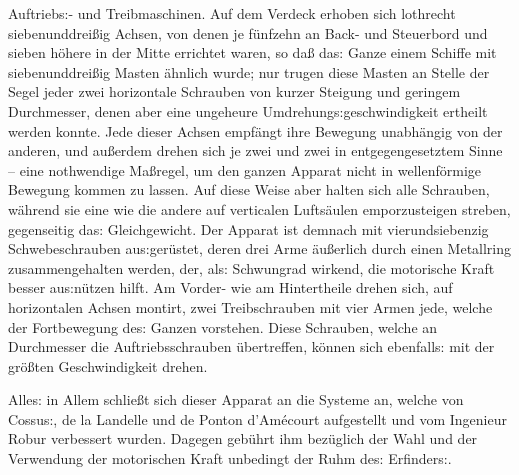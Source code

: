 \documentclass[oneside,12pt]{book}
\newcommand{\s}{s:}
\begin{document}
Auftrieb{\s}- und Treibmaschinen. Auf dem Verdeck erhoben sich
lothrecht siebenunddrei{\ss}ig Achsen, von denen je f\"unfzehn an
Back- und Steuerbord und sieben h\"ohere in der Mitte errichtet
waren, so da{\ss} da{\s} Ganze einem Schiffe mit siebenunddrei{\ss}ig
Masten \"ahnlich wurde; nur trugen diese Masten an Stelle der Segel
jeder zwei horizontale Schrauben von kurzer Steigung und geringem
Durchmesser, denen aber eine ungeheure Umdrehung{\s}geschwindigkeit
ertheilt werden konnte. Jede dieser Achsen empf\"angt ihre Bewegung
unabh\"angig von der anderen, und au{\ss}erdem drehen sich je zwei
und zwei in entgegengesetztem Sinne -- eine nothwendige Ma{\ss}regel,
um den ganzen Apparat nicht in wellenf\"ormige Bewegung kommen zu
lassen. Auf diese Weise aber halten sich alle Schrauben, w\"ahrend
sie eine wie die andere auf verticalen Lufts\"aulen emporzusteigen
streben, gegenseitig da{\s} Gleichgewicht. Der Apparat ist demnach
mit vierundsiebenzig Schwebeschrauben au{\s}ger\"ustet, deren drei
Arme \"au{\ss}erlich durch einen Metallring zusammengehalten werden,
der, al{\s} Schwungrad wirkend, die motorische Kraft besser
au{\s}n\"utzen hilft. Am Vorder- wie am Hintertheile drehen sich, auf
horizontalen Achsen montirt, zwei Treibschrauben mit vier Armen jede,
welche der Fortbewegung de{\s} Ganzen vorstehen. Diese Schrauben,
welche an Durchmesser die Auftriebsschrauben \"ubertreffen, k\"onnen
sich ebenfall{\s} mit der gr\"o{\ss}ten Geschwindigkeit drehen.

Alle{\s} in Allem schlie{\ss}t sich dieser Apparat an die Systeme an,
welche von Cossu{\s}, de la Landelle und de Ponton d'Am\'ecourt
aufgestellt und vom Ingenieur Robur verbessert wurden. Dagegen
geb\"uhrt ihm bez\"uglich der Wahl und der Verwendung der motorischen
Kraft unbedingt der Ruhm de{\s} Erfinder{\s}.
\end{document}
